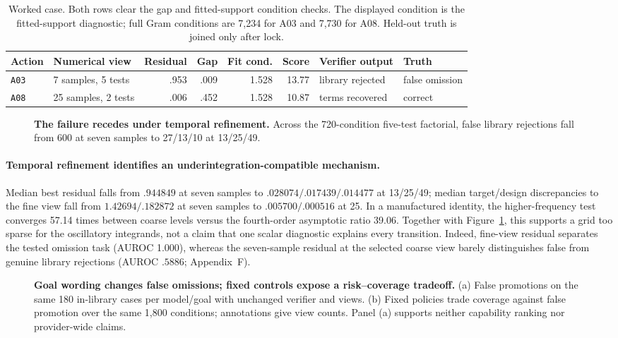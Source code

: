 \documentclass{article}
\begin{document}
\begin{table}[H]
\centering
\scriptsize
\caption{Worked case. Both rows clear the gap and fitted-support condition checks. The displayed
condition is the fitted-support diagnostic; full Gram conditions are 7,234 for A03 and 7,730 for
A08. Held-out truth is joined only after lock.}
\label{tab:worked-action}
\begin{tabular}{@{}llrrrrll@{}}
\toprule
Action & Numerical view & Residual & Gap & Fit cond. & Score & Verifier output & Truth \\
\midrule
\texttt{A03} & 7 samples, 5 tests  & .953 & .009 & 1.528 & 13.77 & library rejected & false omission \\
\texttt{A08} & 25 samples, 2 tests & .006 & .452 & 1.528 & 10.87 & terms recovered  & correct \\
\bottomrule
\end{tabular}
\end{table}

\begin{figure}[H]
\centering

\caption{\textbf{The failure recedes under temporal refinement.} Across the 720-condition five-test
factorial, false library rejections fall from 600 at seven samples to 27/13/10 at 13/25/49.}
\label{fig:convergence}
\end{figure}

\paragraph{Temporal refinement identifies an underintegration-compatible mechanism.}
Median best residual falls from $.944849$ at seven samples to $.028074/.017439/.014477$ at 13/25/49;
median target/design discrepancies to the fine view fall from $1.42694/.182872$ at seven samples to
$.005700/.000516$ at 25. In a manufactured identity, the higher-frequency test converges 57.14 times
between coarse levels versus the fourth-order asymptotic ratio 39.06. Together with
Figure~\ref{fig:convergence}, this supports a grid too sparse for the oscillatory integrands, not a
claim that one scalar diagnostic explains every transition. Indeed, fine-view residual separates the
tested omission task (AUROC 1.000), whereas the seven-sample residual at the selected coarse view
barely distinguishes false from genuine library rejections (AUROC $.5886$; Appendix~F).

\begin{figure}[t]
\centering
\resizebox{\linewidth}{!}{}
\caption{\textbf{Goal wording changes false omissions; fixed controls expose a risk--coverage tradeoff.}
(a) False promotions on the same 180 in-library cases per model/goal with unchanged verifier and
views. (b) Fixed policies trade coverage against false promotion over the same 1,800 conditions;
annotations give view counts. Panel (a) supports neither capability ranking nor provider-wide claims.}
\label{fig:gaming}
\end{figure}
\end{document}

